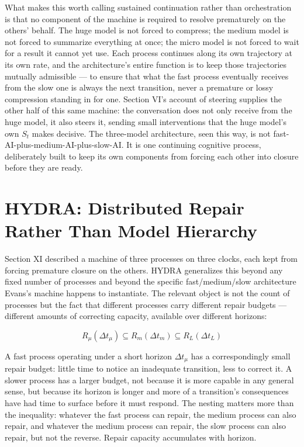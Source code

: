 \documentclass[11pt]{article}
\begin{document}
What makes this worth calling sustained continuation rather than orchestration is that no component of the machine is required to resolve prematurely on the others' behalf. The huge model is not forced to compress; the medium model is not forced to summarize everything at once; the micro model is not forced to wait for a result it cannot yet use. Each process continues along its own trajectory at its own rate, and the architecture's entire function is to keep those trajectories mutually admissible --- to ensure that what the fast process eventually receives from the slow one is always the next transition, never a premature or lossy compression standing in for one. Section VI's account of steering supplies the other half of this same machine: the conversation does not only receive from the huge model, it also steers it, sending small interventions that the huge model's own $S_t$ makes decisive. The three-model architecture, seen this way, is not fast-AI-plus-medium-AI-plus-slow-AI. It is one continuing cognitive process, deliberately built to keep its own components from forcing each other into closure before they are ready.

\section{HYDRA: Distributed Repair Rather Than Model Hierarchy}

Section XI described a machine of three processes on three clocks, each kept from forcing premature closure on the others. HYDRA generalizes this beyond any fixed number of processes and beyond the specific fast/medium/slow architecture Evans's machine happens to instantiate. The relevant object is not the count of processes but the fact that different processes carry different repair budgets --- different amounts of correcting capacity, available over different horizons:

\[
R_\mu(\Delta t_\mu) \subseteq R_m(\Delta t_m) \subseteq R_L(\Delta t_L)
\]

A fast process operating under a short horizon $\Delta t_\mu$ has a correspondingly small repair budget: little time to notice an inadequate transition, less to correct it. A slower process has a larger budget, not because it is more capable in any general sense, but because its horizon is longer and more of a transition's consequences have had time to surface before it must respond. The nesting matters more than the inequality: whatever the fast process can repair, the medium process can also repair, and whatever the medium process can repair, the slow process can also repair, but not the reverse. Repair capacity accumulates with horizon.
\end{document}
